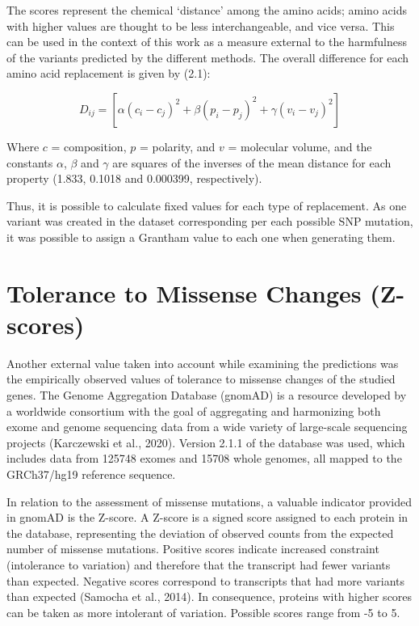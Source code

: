 \documentclass[12pt,MSc,wordcount,anon]{muthesis}
\begin{document}
\begin{flushleft}
The scores represent the chemical `distance' among the amino acids; amino acids with higher values are thought to be less interchangeable, and vice versa. This can be used in the context of this work as a measure external to the harmfulness of the variants predicted by the different methods. The overall difference for each amino acid replacement is given by (2.1):

\begin{equation}
\displaystyle D_{ij}=[\alpha (c_{i}-c_{j})^{2}+\beta (p_{i}-p_{j})^{2}+\gamma (v_{i}-v_{j})^{2}]
\end{equation}

Where $c$ = composition, $p$ = polarity, and $v$ = molecular volume, and the constants $\alpha$, $\beta$ and $\gamma$ are squares of the inverses of the mean distance for each property (1.833, 0.1018 and 0.000399, respectively).

Thus, it is possible to calculate fixed values for each type of replacement. As one variant was created in the dataset corresponding per each possible SNP mutation, it was possible to assign a Grantham value to each one when generating them.

\section{Tolerance to Missense Changes (Z-scores)}

Another external value taken into account while examining the predictions was the empirically observed values of tolerance to missense changes of the studied genes. The Genome Aggregation Database (gnomAD) is a resource developed by a worldwide consortium with the goal of aggregating and harmonizing both exome and genome sequencing data from a wide variety of large-scale sequencing projects (Karczewski et al., 2020). Version 2.1.1 of the database was used, which includes data from 125748 exomes and 15708 whole genomes, all mapped to the GRCh37/hg19 reference sequence.

In relation to the assessment of missense mutations, a valuable indicator provided in gnomAD is the Z-score. A Z-score is a signed score assigned to each protein in the database, representing the deviation of observed counts from the expected number of missense mutations. Positive scores indicate increased constraint (intolerance to variation) and therefore that the transcript had fewer variants than expected. Negative scores correspond to transcripts that had more variants than expected (Samocha et al., 2014). In consequence, proteins with higher scores can be taken as more intolerant of variation. Possible scores range from -5 to 5.


\end{flushleft}
\end{document}
